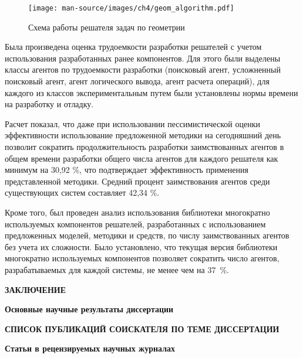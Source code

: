 \documentclass{thesisby}
\begin{document}
\begin{figure}[H]
    \centering
    \texttt{[image: man-source/images/ch4/geom\_algorithm.pdf]}
    \caption{Схема работы решателя задач по геометрии}
    \label{fig:pic_geom_alg}
\end{figure}

\vspace{-3mm}


Была произведена оценка трудоемкости разработки решателей с учетом использования разработанных ранее компонентов. Для этого были выделены классы агентов по трудоемкости разработки (поисковый агент, усложненный поисковый агент, агент логического вывода, агент расчета операций), для каждого из классов экспериментальным путем были установлены нормы времени на разработку и отладку.

Расчет показал, что даже при использовании пессимистической оценки эффективности использование предложенной методики на сегодняшний день позволит сократить продолжительность разработки заимствованных агентов в общем времени разработки общего числа агентов для каждого решателя как минимум на 30,92 \%, что подтверждает эффективность применения представленной методики. Средний процент заимствования агентов среди существующих систем составляет 42,34 \%. 

Кроме того, был проведен анализ использования библиотеки многократно используемых компонентов решателей, разработанных с использованием предложенных моделей, методики и средств, по числу заимствованных агентов без учета их сложности. Было установлено, что текущая версия библиотеки многократно используемых компонентов позволяет сократить число агентов, разрабатываемых для каждой системы, не менее чем на 37~\%.

\bigskip
\centerline{\bf ЗАКЛЮЧЕНИЕ}
\smallskip
{\bf Основные научные результаты диссертации}
\smallskip



\medskip




\def\selectlanguageifdefined#1{
\expandafter\ifx\csname date#1\endcsname\relax
\else\language\csname l@#1\endcsname\fi}

\bigskip
\centerline{\bf СПИСОК ПУБЛИКАЦИЙ СОИСКАТЕЛЯ ПО ТЕМЕ ДИССЕРТАЦИИ}

\vspace{1mm}
{\bf Статьи в рецензируемых научных журналах}
\vspace{2mm}
\end{document}
